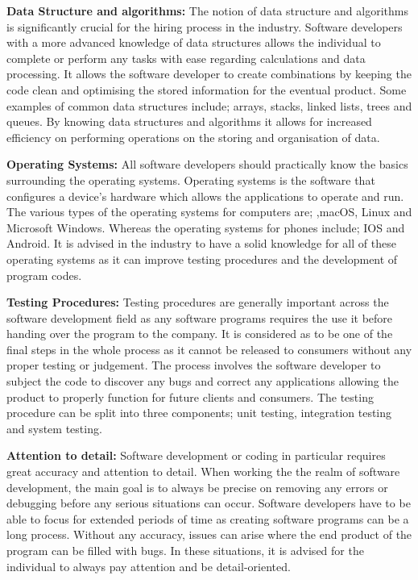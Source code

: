 \documentclass[a4paper, 11pt]{report}
\begin{document}
\textbf{Data Structure and algorithms:} 
The notion of data structure and algorithms is significantly crucial for the hiring process in the industry. Software developers with a more advanced knowledge of data structures allows the individual to complete or perform any tasks with ease regarding calculations and data processing. It allows the software developer to create combinations by keeping the code clean and optimising the stored information for the eventual product. Some examples of common data structures include; arrays, stacks, linked lists, trees and queues. By knowing data structures and algorithms it allows for increased efficiency on performing operations on the storing and organisation of data. 

\textbf{Operating Systems:} 
All software developers should practically know the basics surrounding the operating systems. Operating systems is the software that configures a device's hardware which allows the applications to operate and run. The various types of the operating systems for computers are; ,macOS, Linux and Microsoft Windows. Whereas the operating systems for phones include; IOS and Android. It is advised in the industry to have a solid knowledge for all of these operating systems as it can improve testing procedures and the development of program codes. 

\textbf{Testing Procedures:} 
Testing procedures are generally important across the software development field as any software programs requires the use it before handing over the program to the company. It is considered as to be one of the final steps in the whole process as it cannot be released to consumers without any proper testing or judgement. The process involves the software developer to subject the code to discover any bugs and correct any applications allowing the product to properly function for future clients and consumers. The testing procedure can be split into three components; unit testing, integration testing and system testing.  

\textbf{Attention to detail:} 
Software development or coding in particular requires great accuracy and attention to detail. When working the the realm of software development, the main goal is to always be precise on removing any errors or debugging before any serious situations can occur. Software developers have to be able to focus for extended periods of time as creating software programs can be a long process. Without any accuracy, issues can arise where the end product of the program can be filled with bugs. In these situations, it is advised for the individual to always pay attention and be detail-oriented.
\end{document}
